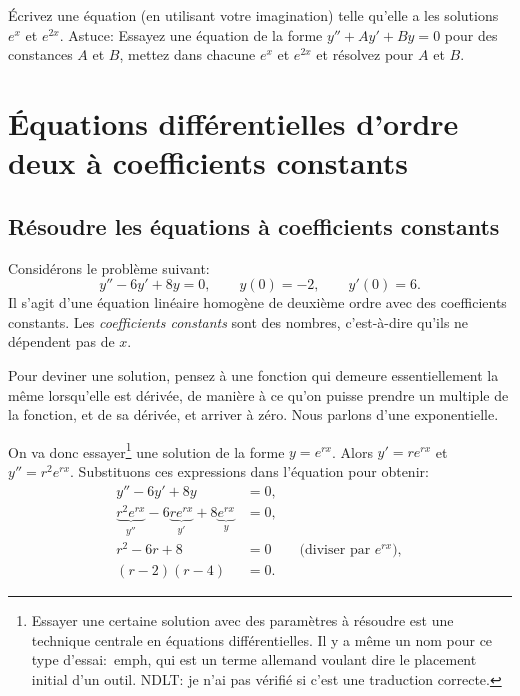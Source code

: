 \begin{exercise}
Écrivez une équation (en utilisant votre imagination) telle qu'elle a les solutions 
$e^x$ et $e^{2x}$.  Astuce: Essayez une équation de la forme 
$y''+Ay'+By = 0$ pour des constances $A$ et $B$,
mettez dans chacune $e^x$ et $e^{2x}$ et résolvez pour $A$ et $B$.
\end{exercise}



\sectionnewpage
\section{Équations différentielles d'ordre deux à coefficients constants}
\label{sec:ccsol}





\subsection{Résoudre les équations à coefficients constants}

Considérons le problème suivant: 
\begin{equation*}
y''-6y'+8y = 0, \qquad y(0) = - 2, \qquad y'(0) = 6 .
\end{equation*}
Il s'agit d'une équation linéaire homogène de deuxième ordre avec des coefficients constants. Les  \emph{coefficients constants }
sont des nombres, c'est-à-dire qu'ils ne dépendent pas de $x$.  

Pour deviner une solution, pensez à une fonction qui demeure essentiellement la même lorsqu'elle est dérivée, de manière à ce qu'on puisse prendre un multiple de la fonction, et de sa dérivée,  et arriver à zéro.  Nous parlons d'une exponentielle. 

On va donc essayer\footnote{%
Essayer une certaine solution avec des paramètres à résoudre est une technique centrale en équations différentielles.  Il y a même un nom pour ce type d'essai:\ emph{}, qui est un terme allemand voulant dire le  \og{}placement initial d'un outil\fg{}.  NDLT: je n'ai pas vérifié si c'est une traduction correcte.} une solution de la forme $y = e^{rx}$.  Alors $y' = r e^{rx}$ et
$y'' = r^2 e^{rx}$.  Substituons ces expressions dans l'équation pour obtenir: 
\begin{align*}
y''-6y'+8y & = 0 , \\
\underbrace{r^2 e^{rx}}_{y''} -6 \underbrace{r e^{rx}}_{y'}+8 \underbrace{e^{rx}}_{y} & = 0 , \\
r^2 -6 r +8 & = 0 \qquad \text{(diviser par } e^{rx} \text{)},\\
(r-2)(r-4) & = 0 .
\end{align*}

